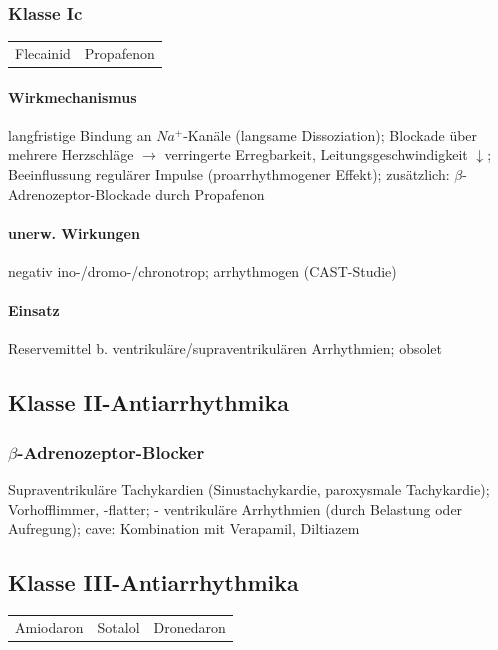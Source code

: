\documentclass[10pt,a4paper]{report}
\begin{document}
\subsubsection{Klasse Ic}
\begin{tabularx}{\textwidth}{XX}
Flecainid&Propafenon\\ 
\end{tabularx}

\paragraph{Wirkmechanismus} langfristige Bindung an $Na^+$-Kanäle (langsame Dissoziation); Blockade über mehrere Herzschläge $\rightarrow$ verringerte Erregbarkeit, Leitungsgeschwindigkeit $\downarrow$; Beeinflussung regulärer Impulse (proarrhythmogener Effekt); zusätzlich: $\beta$-Adrenozeptor-Blockade durch Propafenon

\paragraph{unerw. Wirkungen} negativ ino-/dromo-/chronotrop; arrhythmogen (CAST-Studie)

\paragraph{Einsatz} Reservemittel b. ventrikuläre/supraventrikulären Arrhythmien; obsolet

\subsection{Klasse II-Antiarrhythmika}

\subsubsection{$\beta$-Adrenozeptor-Blocker} Supraventrikuläre Tachykardien (Sinustachykardie, paroxysmale Tachykardie); Vorhofflimmer, -flatter; - ventrikuläre Arrhythmien (durch Belastung oder Aufregung); cave: Kombination mit Verapamil, Diltiazem

\subsection{Klasse III-Antiarrhythmika}

\begin{tabularx}{\textwidth}{XXX}
Amiodaron&Sotalol&Dronedaron\\
\end{tabularx}
\end{document}
